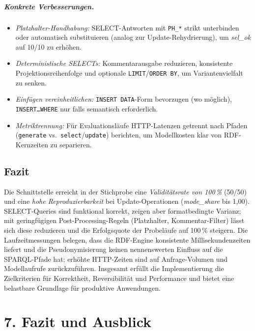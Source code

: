 \paragraph{Konkrete Verbesserungen.}
\begin{itemize}
  \item \emph{Platzhalter-Handhabung:} SELECT-Antworten mit \texttt{PH\_*} strikt unterbinden oder automatisch substituieren (analog zur Update-Rehydrierung), um \emph{sel\_ok} auf 10/10 zu erhöhen.
  \item \emph{Deterministische SELECTs:} Kommentarausgabe reduzieren, konsistente Projektionsreihenfolge und optionale \texttt{LIMIT}/\texttt{ORDER BY}, um Variantenvielfalt zu senken.
  \item \emph{Einfügen vereinheitlichen:} \texttt{INSERT DATA}-Form bevorzugen (wo möglich), \texttt{INSERT\ldots WHERE} nur falls semantisch erforderlich.
  \item \emph{Metriktrennung:} Für Evaluationsläufe HTTP-Latenzen getrennt nach Pfaden (\texttt{generate} vs.\ \texttt{select}/\texttt{update}) berichten, um Modellkosten klar von RDF-Kernzeiten zu separieren.
\end{itemize}

\section{Fazit}
\label{subsec:conclusion}
Die Schnittstelle erreicht in der Stichprobe eine \emph{Validitätsrate von 100\,\%} (50/50) und eine \emph{hohe Reproduzierbarkeit} bei Update-Operationen (\emph{mode\_share} bis 1{,}00). SELECT-Queries sind funktional korrekt, zeigen aber formatbedingte Varianz; mit geringfügigen Post-Processing-Regeln (Platzhalter, Kommentar-Filter) lässt sich diese reduzieren und die Erfolgsquote der Probeläufe auf 100\,\% steigern. Die Laufzeitmessungen belegen, dass die RDF-Engine konsistente Millisekundenzeiten liefert und die Pseudonymisierung keinen nennenswerten Einfluss auf die SPARQL-Pfade hat; erhöhte HTTP-Zeiten sind auf Anfrage-Volumen und Modellaufrufe zurückzuführen. Insgesamt erfüllt die Implementierung die Zielkriterien für Korrektheit, Reversibilität und Performance und bietet eine belastbare Grundlage für produktive Anwendungen.






\chapter{7. Fazit und Ausblick}
\label{sec:Fazit und Ausblick}

